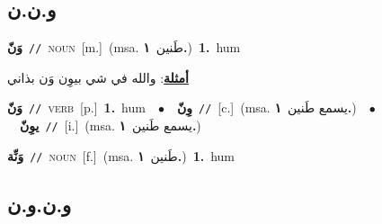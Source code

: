 \documentclass[10pt,a4paper,twoside]{article} %
\begin{document}
\begin{multicols}{2}
\vspace{-3mm}
\subsection*{\color{blue}\foreignlanguage{arabic}{و.ن.ن}\color{blue}{}} 

{\setlength\topsep{0pt}\textbf{\foreignlanguage{arabic}{وَنّ}}\ {\color{gray}\texttt{//}\color{black}}\ \textsc{noun}\ [m.]\ \color{gray}(msa. \foreignlanguage{arabic}{طَنين}~\foreignlanguage{arabic}{\textbf{١.}})\color{black}\ \textbf{1.}~hum\  \begin{flushright}\color{gray}\foreignlanguage{arabic}{\textbf{\underline{\foreignlanguage{arabic}{أمثلة}}}: والله في شي بيوِن وَن بذاني}\end{flushright}\color{black}} \vspace{2mm}

{\setlength\topsep{0pt}\textbf{\foreignlanguage{arabic}{وَنّ}}\ {\color{gray}\texttt{//}\color{black}}\ \textsc{verb}\ [p.]\ \textbf{1.}~hum\ \ $\bullet$\ \ \setlength\topsep{0pt}\textbf{\foreignlanguage{arabic}{وِنّ}}\ {\color{gray}\texttt{//}\color{black}}\ [c.]\ \color{gray}(msa. \foreignlanguage{arabic}{يسمع طَنين}~\foreignlanguage{arabic}{\textbf{١.}})\color{black}\ \ $\bullet$\ \ \setlength\topsep{0pt}\textbf{\foreignlanguage{arabic}{يوِنّ}}\ {\color{gray}\texttt{//}\color{black}}\ [i.]\ \color{gray}(msa. \foreignlanguage{arabic}{يسمع طَنين}~\foreignlanguage{arabic}{\textbf{١.}})\color{black}\ } \vspace{2mm}

{\setlength\topsep{0pt}\textbf{\foreignlanguage{arabic}{وَنِّة}}\ {\color{gray}\texttt{//}\color{black}}\ \textsc{noun}\ [f.]\ \color{gray}(msa. \foreignlanguage{arabic}{طَنين}~\foreignlanguage{arabic}{\textbf{١.}})\color{black}\ \textbf{1.}~hum\ } \vspace{2mm}

\vspace{-3mm}
\subsection*{\color{blue}\foreignlanguage{arabic}{و.ن.و.ن}\color{blue}{}} 


\end{multicols}
\end{document}
